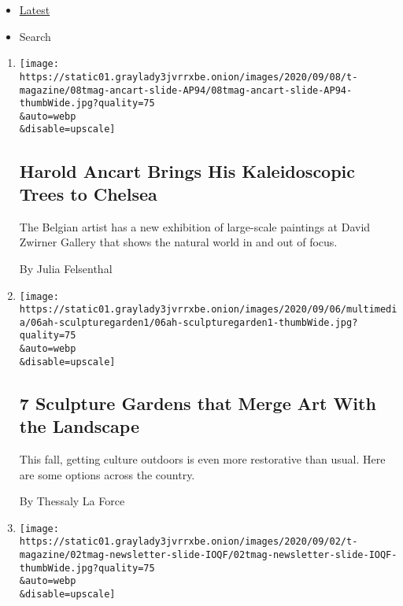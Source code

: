 \begin{itemize}
\tightlist
\item
  \protect\hyperlink{stream-panel}{Latest}
\item
  Search
\end{itemize}

\begin{enumerate}
\def\labelenumi{\arabic{enumi}.}
\item
  \href{/2020/09/08/t-magazine/harold-ancart.html}{}

  \texttt{[image: https://static01.graylady3jvrrxbe.onion/images/2020/09/08/t-magazine/08tmag-ancart-slide-AP94/08tmag-ancart-slide-AP94-thumbWide.jpg?quality=75\\\&auto=webp\\\&disable=upscale]}

  \hypertarget{harold-ancart-brings-his-kaleidoscopic-trees-to-chelsea}{%
  \subsection{Harold Ancart Brings His Kaleidoscopic Trees to
  Chelsea}\label{harold-ancart-brings-his-kaleidoscopic-trees-to-chelsea}}

  The Belgian artist has a new exhibition of large-scale paintings at
  David Zwirner Gallery that shows the natural world in and out of
  focus.

  By Julia Felsenthal
\item
  \href{/2020/09/05/at-home/visit-sculpture-gardens.html}{}

  \texttt{[image: https://static01.graylady3jvrrxbe.onion/images/2020/09/06/multimedia/06ah-sculpturegarden1/06ah-sculpturegarden1-thumbWide.jpg?quality=75\\\&auto=webp\\\&disable=upscale]}

  \hypertarget{7-sculpture-gardens-that-merge-art-with-the-landscape}{%
  \subsection{7 Sculpture Gardens that Merge Art With the
  Landscape}\label{7-sculpture-gardens-that-merge-art-with-the-landscape}}

  This fall, getting culture outdoors is even more restorative than
  usual. Here are some options across the country.

  By Thessaly La Force
\item
  \href{/2020/09/03/t-magazine/ollies-pizza-estee-lauder-met.html}{}

  \texttt{[image: https://static01.graylady3jvrrxbe.onion/images/2020/09/02/t-magazine/02tmag-newsletter-slide-IOQF/02tmag-newsletter-slide-IOQF-thumbWide.jpg?quality=75\\\&auto=webp\\\&disable=upscale]}


\end{enumerate}
